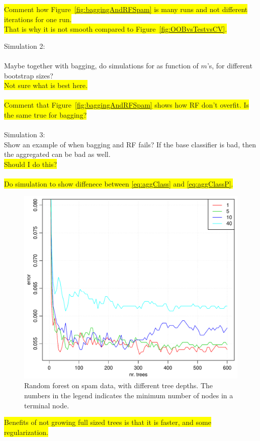 \colorbox{yellow}{Comment how Figure~\ref{fig:baggingAndRFSpam} is many runs and not different iterations for one run.}
\\\colorbox{yellow}{That is why it is not smooth compared to Figure~\ref{fig:OOBvsTestvsCV}.}


Simulation 2: \\
\\
Maybe together with bagging, do simulations for as function of $m$'s, for different bootstrap sizes? \\
\colorbox{yellow}{Not sure what is best here.}\\
\\
\colorbox{yellow}{Comment that Figure~\ref{fig:baggingAndRFSpam} shows how RF don't overfit. Is the same true for bagging?}\\
\\
Simulation 3: \\
Show an example of when bagging and RF fails? If the base classifier is bad, then the aggregated can be bad as well.\\
\colorbox{yellow}{Should I do this?}\\
\\
\colorbox{yellow}{Do simulation to show diffenece between \eqref{eq:aggClass} and \eqref{eq:aggClassP}.}


\begin{figure}[h!]
\begin{center}
    \includegraphics[scale=0.5]{./figures/RFTreeDepth.pdf}
\end{center}
\caption{Random forest on spam data, with different tree depths. The numbers in the legend indicates the minimum number of nodes in a terminal node.}
\label{fig:RFTreeDepth}
\end{figure}
\colorbox{yellow}{Benefits of not growing full sized trees is that it is faster, and some regularization.}


